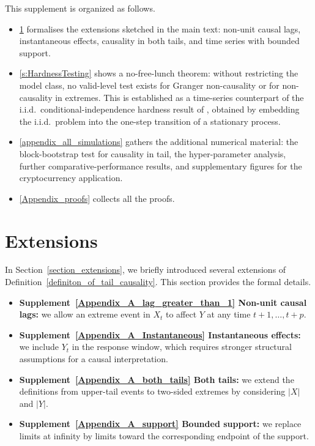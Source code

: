 \documentclass[a4paper,11pt]{article}
\begin{document}
This supplement is organized as follows.
\begin{itemize}
    \item \ref{Appendix_A} formalises the extensions sketched in the main text: non-unit causal lags, instantaneous effects, causality in both tails, and time series with bounded support.
    \item \ref{s:HardnessTesting} shows a no-free-lunch theorem: without restricting the model class, no valid-level test exists for Granger non-causality or for non-causality in extremes. This is established as a time-series counterpart of the i.i.d.\ conditional-independence hardness result of \cite{HARDNESS_OF_CONDITIONAL_TESTING}, obtained by embedding the i.i.d.\ problem into the one-step transition of a stationary process.
    \item \ref{appendix_all_simulations} gathers the additional numerical material: the block-bootstrap test for causality in tail, the hyper-parameter analysis, further comparative-performance results, and supplementary figures for the cryptocurrency application.
    \item \ref{Appendix_proofs} collects all the proofs.
\end{itemize}






\section{Extensions}
\label{Appendix_A}

In Section~\ref{section_extensions}, we briefly introduced several extensions of
Definition~\ref{definiton_of_tail_causality}. This section provides the formal details.

\begin{itemize}
    \item \textbf{Supplement~\ref{Appendix_A_lag_greater_than_1} Non-unit causal lags:} we allow an extreme event in $X_t$ to affect
    $Y$ at any time $t+1,\ldots,t+p$.

    \item \textbf{Supplement~\ref{Appendix_A_Instantaneous} Instantaneous effects:} we include $Y_t$ in the response window, which
    requires stronger structural assumptions for a causal interpretation.

    \item \textbf{Supplement~\ref{Appendix_A_both_tails} Both tails:} we extend the definitions from upper-tail events to
    two-sided extremes by considering $|X|$ and $|Y|$.

    \item \textbf{Supplement~\ref{Appendix_A_support} Bounded support:} we replace limits at infinity by limits toward the
    corresponding endpoint of the support.
\end{itemize}
\end{document}
